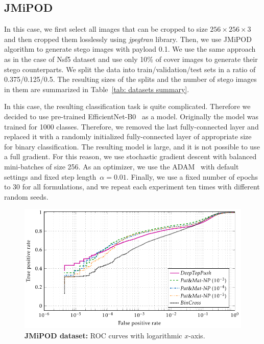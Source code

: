 \subsection{JMiPOD}

In this case, we first select all images that can be cropped to size $256 \times 256 \times 3$ and then cropped them losslessly using \emph{jpegtran} library. Then, we use JMiPOD~\cite{cogranne2020steganography} algorithm to generate stego images with payload 0.1. We use the same approach as in the case of Nsf5 dataset and use only 10\% of cover images to generate their stego counterparts. We split the data into train/validation/test sets in a ratio of 0.375/0.125/0.5. The resulting sizes of the splits and the number of stego images in them are summarized in Table~\ref{tab: datasets summary}. 

In this case, the resulting classification task is quite complicated. Therefore we decided to use pre-trained EfficientNet-B0~\cite{tan2019efficientnet} as a model. Originally the model was trained for 1000 classes. Therefore, we removed the last fully-connected layer and replaced it with a randomly initialized fully-connected layer of appropriate size for binary classification. The resulting model is large, and it is not possible to use a full gradient. For this reason, we use stochastic gradient descent with balanced mini-batches of size 256. As an optimizer, we use the ADAM~\cite{kingma2014adam} with default settings and fixed step length~$\alpha = 0.01.$ Finally, we use a fixed number of epochs to 30 for all formulations, and we repeat each experiment ten times with different random seeds.

\begin{figure}[!t]
  \centering
  \includegraphics{images/stego_jmipod.pdf}
  \caption{\textbf{JMiPOD dataset:} ROC curves with logarithmic $x$-axis.}
  \label{fig: steganalysis jmipod}
\end{figure}

